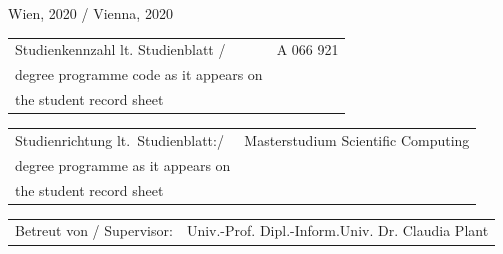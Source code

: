 \begin{titlepage}
\noindent\textsf{Wien, 2020 / Vienna, 2020}  %
\vfill

\noindent\begin{tabular}{@{}p{8cm}p{8cm}}
\textsf{Studienkennzahl lt. Studienblatt / }
&
\textsf{A 066 921} %
\\
\textsf{degree programme code as it appears on}
&
\\
\textsf{the student record sheet}
&
\\
\end{tabular}

\vspace{0.2cm}
\noindent\begin{tabular}{@{}p{8cm}p{8cm}}
\textsf{Studienrichtung lt.\ Studienblatt:/}
&
\textsf{Masterstudium Scientific Computing}  %
\\
\textsf{degree programme as it appears on}
&
\\
\textsf{the student record sheet}
&
\\
\end{tabular}

\vspace{0.2cm}

\noindent\begin{tabular}{@{}p{8cm}p{8cm}}
\textsf{Betreut von / Supervisor:}
&
\textsf{Univ.-Prof. Dipl.-Inform.Univ. Dr. Claudia Plant}  %
\\
\end{tabular}

\end{titlepage}


%
%
%
%

%

